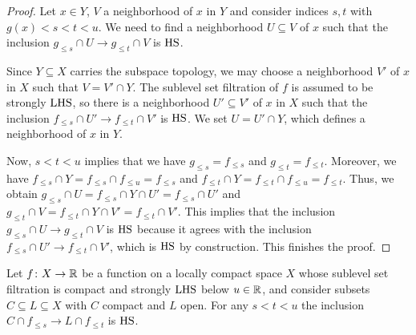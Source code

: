 \begin{proof}
    Let $x \in Y$, $V$ a neighborhood of $x$ in $Y$ and consider indices $s,t$ with $g(x) < s < t < u$. 
    We need to find a neighborhood $U \subseteq V$ of $x$ such that the inclusion $g_{\leq s} \cap U \to g_{\leq t} \cap V$ is $\mathrm{HS}$.
    
    Since $Y \subseteq X$ carries the subspace topology, we may choose a neighborhood $V'$ of $x$ in $X$ such that $V = V' \cap Y$. 
    The sublevel set filtration of $f$ is assumed to be strongly $\mathrm{LHS}$, so there is a neighborhood $U' \subseteq V'$ of $x$ in $X$ such that the inclusion $f_{\leq s} \cap U' \to f_{\leq t} \cap V'$ is $\mathrm{HS}$.
    We set $U = U' \cap Y$, which defines a neighborhood of $x$ in $Y$.
    
    Now, $s < t < u$ implies that we have $g_{\leq s} = f_{\leq s}$ and $g_{\leq t} = f_{\leq t}$. 
    Moreover, we have $f_{\leq s} \cap Y = f_{\leq s} \cap f_{\leq u} = f_{\leq s}$ and $f_{\leq t} \cap Y = f_{\leq t} \cap f_{\leq u} = f_{\leq t}$. 
    Thus, we obtain $g_{\leq s} \cap U = f_{\leq s} \cap Y \cap U' = f_{\leq s} \cap U'$ and $g_{\leq t} \cap V = f_{\leq t} \cap Y \cap V' = f_{\leq t} \cap V'$.
    This implies that the inclusion $g_{\leq s} \cap U \to g_{\leq t} \cap V$ is $\mathrm{HS}$ because it agrees with the inclusion $f_{\leq s} \cap U' \to f_{\leq t} \cap V'$, which is $\mathrm{HS}$ by construction. This finishes the proof.
\end{proof}

\begin{lem} \label{l:key lemma for q-tameness}
    Let $f \colon X \to \mathbb{R}$ be a function on a locally compact space $X$ whose sublevel set filtration is compact and strongly $\mathrm{LHS}$ below $u \in \mathbb{R}$, and consider subsets $C \subseteq L \subseteq X$ with $C$ compact and $L$ open.
	For any $s < t < u$ the inclusion $C \cap f_{\leq s} \to L \cap f_{\leq t}$ is $\mathrm{HS}$.
\end{lem}

